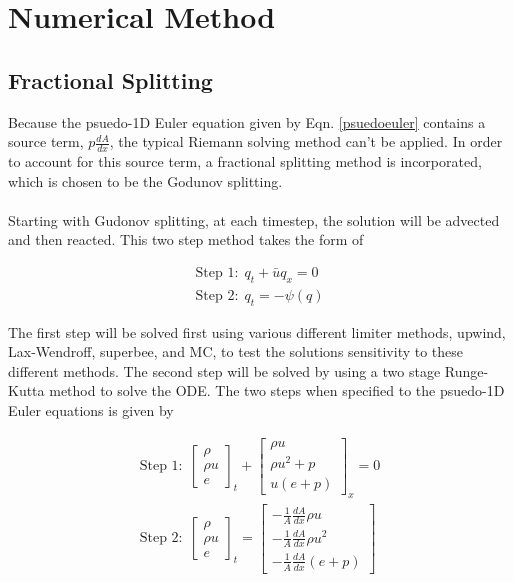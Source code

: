 \documentclass{article}%
\numberwithin{equation}{section}
\begin{document}
\section{Numerical Method}

\subsection{Fractional Splitting}
Because the psuedo-1D Euler equation given by Eqn. \ref{psuedoeuler} contains a source term, $p \frac{dA}{dx}$, the typical Riemann solving method can't be applied. In order to account for this source term, a fractional splitting method is incorporated, which is chosen to be the Godunov splitting.
\\
\\
Starting with Gudonov splitting, at each timestep, the solution will be advected and then reacted. This two step method takes the form of

\begin{equation}
\begin{split}
\text{Step 1:} \ \ q_t + \bar{u} q_x = 0 \\
\text{Step 2:} \ \ q_t = -\psi(q)
\end{split}
\end{equation}  

The first step will be solved first using various different limiter methods, upwind, Lax-Wendroff, superbee, and MC, to test the solutions sensitivity to these different methods. The second step will be solved by using a two stage Runge-Kutta method to solve the ODE. The two steps when specified to the psuedo-1D Euler equations is given by

\begin{equation}
\begin{split}
\text{Step 1:} \ \ \left[ \begin{array}{c} \rho  \\ \rho u  \\ e \end{array} \right]_t +  \left[ \begin{array}{c} \rho u  \\ \rho u^2 + p \\ u(e + p) \end{array} \right]_x =  0 \\
\text{Step 2:} \ \ \left[ \begin{array}{c} \rho  \\ \rho u  \\ e  \end{array} \right]_t = \left[ \begin{array}{c} -\frac{1}{A}\frac{dA}{dx} \rho u \\ -\frac{1}{A} \frac{dA}{dx} \rho u^2  \\ -\frac{1}{A} \frac{dA}{dx}  (e + p)  \end{array} \right]    \end{split}
\label{eq:splitting}
\end{equation}
\end{document}
